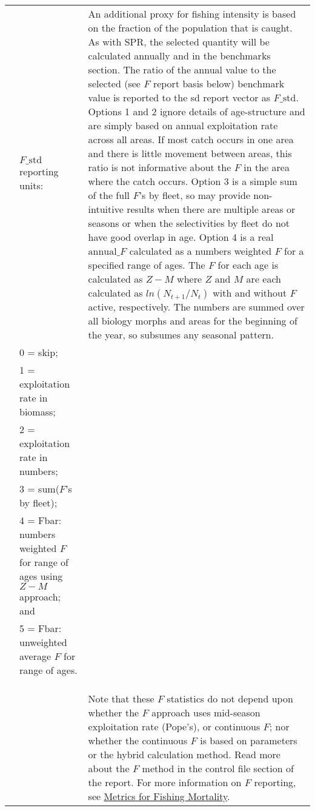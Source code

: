 {\begin{landscape}
\begin{longtable}{p{1.5cm} p{7.2cm} p{12.3cm}}
\pagebreak
\hline 
 4 & $F\text{\_std}$ reporting units: & \multirow{1}{12.3cm}[-0.25cm]{\parbox{12.3cm}{An additional proxy for fishing intensity is based on the fraction of the population that is caught. As with SPR, the selected quantity will be calculated annually and in the benchmarks section. The ratio of the annual value to the selected (see $F$ report basis below) benchmark value is reported to the \gls{sd} report vector as $F\text{\_std}$. Options 1 and 2 ignore details of age-structure and are simply based on annual exploitation rate across all areas. If most catch occurs in one area and there is little movement between areas, this ratio is not informative about the $F$ in the area where the catch occurs. Option 3 is a simple sum of the full $F$'s by fleet, so may provide non-intuitive results when there are multiple areas or seasons or when the selectivities by fleet do not have good overlap in age. Option 4 is a real $\text{annual\_}F$ calculated as a numbers weighted $F$ for a specified range of ages. The $F$ for each age is calculated as $Z-M$ where $Z$ and $M$ are each calculated as $ln(N_{t+1}/N_{t})$ with and without $F$ active, respectively. The numbers are summed over all biology morphs and areas for the beginning of the year, so subsumes any seasonal pattern.}} \Tstrut\Bstrut\\
   & 0 = skip; & \\
   & 1 = exploitation rate in biomass; & \\
   & 2 = exploitation rate in numbers; & \\
   & 3 = sum($F$'s by fleet); & \\
   & 4 = Fbar: numbers weighted $F$ for range of ages using $Z-M$ approach; and & \\
   & 5 = Fbar: unweighted average $F$ for range of ages. & \\
   & & \Bstrut\\
   & & \Bstrut\\
   & & \Bstrut\\
   & & Note that these $F$ statistics do not depend upon whether the $F$ approach uses mid-season exploitation rate (Pope's), or continuous $F$; nor whether the continuous $F$ is based on parameters or the hybrid calculation method. Read more about the $F$ method in the control file section of the report. For more information on $F$ reporting, see \hyperlink{FMortality}{Metrics for Fishing Mortality}. \Bstrut\\ 
  

\end{longtable}
\end{landscape}}
